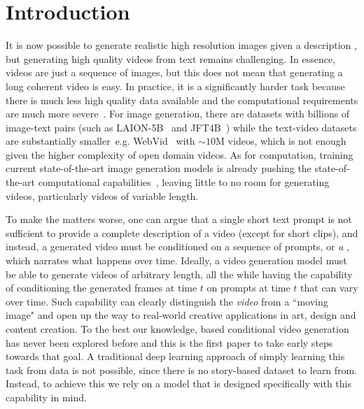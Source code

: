 \section{Introduction}
\afterpage{%
%
}

It is now possible to generate realistic high resolution images given a description \cite{DALLE,ramesh2022hierarchical,nichol2021glide,saharia2022photorealistic,PARTI}, but generating high quality videos from text remains challenging. In essence, videos are just a sequence of images, but this does not mean that generating a long coherent video is easy.  In practice, it is a significantly harder task because there is much less high quality data available and the computational requirements are much more severe~\cite{clark2019adversarial}. For image generation, there are datasets with billions of image-text pairs (such as LAION-5B~\cite{schuhmann2021laion} and JFT4B~\cite{zhai2022scaling}) while the text-video datasets are substantially smaller~e.g. WebVid~\cite{bain2021frozen} with ${\sim}10$M videos, which is not enough given the higher complexity of open domain videos. As for computation, training current state-of-the-art image generation models is already pushing the state-of-the-art computational capabilities~\cite{PARTI}, leaving little to no room for generating videos, particularly videos of variable length.

To make the matters worse, one can argue that a single short text prompt is not sufficient to provide a complete description of a video (except for short clips), and instead, a generated video must be conditioned on a sequence of prompts, or \textit{a \story}, which narrates what happens over time. Ideally, a video generation model must be able to generate videos of arbitrary length, all the while having the capability of conditioning the generated frames at time $t$ on prompts at time $t$ that can vary over time. Such capability can clearly distinguish the \textit{video} from a ``moving image" and open up the way to real-world creative applications in art, design and content creation. To the best our knowledge, \story based conditional video generation has never been explored before and this is the first paper to take early steps towards that goal. A traditional deep learning approach of simply learning this task from data is not possible, since there is no story-based dataset to learn from. Instead, to achieve this we rely on a model that is designed specifically with this capability in mind.

